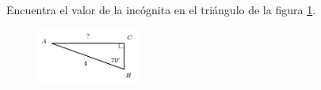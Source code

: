 \question[15]  Encuentra el valor de la incógnita en el triángulo de la figura \ref{fig:lados_functrig_02}.
\begin{figure}[H]
    \begin{center}
        \includegraphics[width=0.3\textwidth]{../images/lados_functrig_02.png}
    \end{center}
    \caption{}
    \label{fig:lados_functrig_02}
\end{figure}